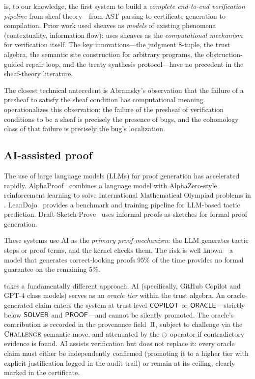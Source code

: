 \JuGeo{} is, to our knowledge, the first system to build a \emph{complete
end-to-end verification pipeline} from sheaf theory---from AST parsing to
certificate generation to \LEAN{} compilation.  Prior work used
sheaves as \emph{models} of existing phenomena (contextuality, information
flow); \JuGeo{} uses sheaves as the \emph{computational mechanism} for
verification itself.  The key innovations---the judgment 8-tuple, the trust
algebra, the semantic site construction for arbitrary programs, the
obstruction-guided repair loop, and the treaty synthesis protocol---have
no precedent in the sheaf-theory literature.

The closest technical antecedent is Abramsky's observation that the failure
of a presheaf to satisfy the sheaf condition has computational meaning.
\JuGeo{} operationalizes this observation: the failure of the presheaf of
verification conditions to be a sheaf is precisely the presence of bugs,
and the cohomology class of that failure is precisely the bug's
localization.

\subsection{AI-assisted proof}\label{sec:related:ai}

The use of large language models (LLMs) for proof generation has
accelerated rapidly.  AlphaProof~\cite{alphaproof2024} combines a
language model with AlphaZero-style reinforcement learning to solve
International Mathematical Olympiad problems in \LEAN{}.
LeanDojo~\cite{leandojo2023} provides a benchmark and training pipeline
for LLM-based tactic prediction.  Draft-Sketch-Prove~\cite{dsp2022}
uses informal proofs as sketches for formal proof generation.

These systems use AI as the \emph{primary proof mechanism}: the LLM
generates tactic steps or proof terms, and the kernel checks them.  The
risk is well known---a model that generates correct-looking proofs 95\%
of the time provides no formal guarantee on the remaining 5\%.

\JuGeo{} takes a fundamentally different approach.  AI (specifically,
GitHub Copilot and GPT-4 class models) serves as an \emph{oracle tier}
within the trust algebra.  An oracle-generated claim enters the system at
trust level $\mathsf{COPILOT}$ or $\mathsf{ORACLE}$---strictly below $\mathsf{SOLVER}$ and
$\mathsf{PROOF}$---and cannot be silently promoted.  The oracle's contribution
is recorded in the provenance field~$\Pi$, subject to challenge via the
$\textsc{Challenge}{}$ semantic move, and attenuated by the $\ominus$ operator
if contradictory evidence is found.  AI assists verification but does not
replace it: every oracle claim must either be independently confirmed
(promoting it to a higher tier with explicit justification logged in the
audit trail) or remain at its ceiling, clearly marked in the certificate.

